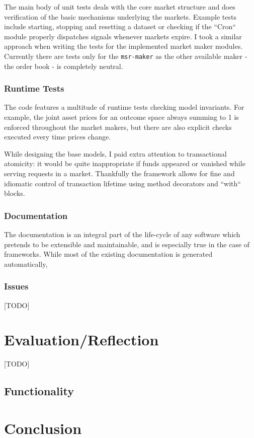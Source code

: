 \documentclass[bsc,frontabs,twoside,singlespacing,parskip,deptreport]{infthesis}     %
\begin{document}
    The main body of unit tests deals with the core market structure and does verification of the basic mechanisms underlying the markets. Example tests include starting, stopping and resetting a dataset or checking if the ``Cron`` module properly dispatches signals whenever markets expire. 
    I took a similar approach when writing the tests for the implemented market maker modules. Currently there are tests only for the {\tt msr-maker} as the other available maker - the order book - is completely neutral. 
    
\subsection{Runtime Tests}
    
    The code features a multitude of runtime tests checking model invariants. For example, the joint asset prices for an outcome space always summing to 1 is enforced throughout the market makers, but there are also explicit checks executed every time prices change.

    While designing the base models, I paid extra attention to transactional atomicity: it would be quite inappropriate if funds appeared or vanished while serving requests in a market. Thankfully the framework allows for fine and idiomatic control of transaction lifetime using method decorators and ``with`` blocks.

\subsection{Documentation}

    The documentation is an integral part of the life-cycle of any software which pretends to be extensible and maintainable, and is especially true in the case of frameworks. While most of the existing documentation is generated automatically, 
    
\subsection{Issues}
    [TODO]
    
\chapter{Evaluation/Reflection}
    [TODO]

\section{Functionality}

\chapter{Conclusion}






\end{document}
